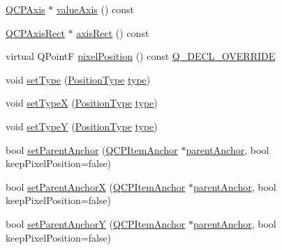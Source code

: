 \begin{DoxyCompactItemize}
\item 
\hyperlink{class_q_c_p_axis}{Q\+C\+P\+Axis} $\ast$ \hyperlink{class_q_c_p_item_position_a8d3a039fb2e69df86b4015daa30dfd2d}{value\+Axis} () const 
\item 
\hyperlink{class_q_c_p_axis_rect}{Q\+C\+P\+Axis\+Rect} $\ast$ \hyperlink{class_q_c_p_item_position_a7f10fa702a324880cc4de958f434cec7}{axis\+Rect} () const 
\item 
virtual Q\+PointF \hyperlink{class_q_c_p_item_position_a8be9a4787635433edecc75164beb748d}{pixel\+Position} () const \hyperlink{qcustomplot_8hh_a42cc5eaeb25b85f8b52d2a4b94c56f55}{Q\+\_\+\+D\+E\+C\+L\+\_\+\+O\+V\+E\+R\+R\+I\+DE}
\item 
void \hyperlink{class_q_c_p_item_position_aa476abf71ed8fa4c537457ebb1a754ad}{set\+Type} (\hyperlink{class_q_c_p_item_position_aad9936c22bf43e3d358552f6e86dbdc8}{Position\+Type} \hyperlink{class_q_c_p_item_position_aecb709d72c9aa334a7f62e2c9e0b5d60}{type})
\item 
void \hyperlink{class_q_c_p_item_position_a2113b2351d6d00457fb3559a4e20c3ea}{set\+TypeX} (\hyperlink{class_q_c_p_item_position_aad9936c22bf43e3d358552f6e86dbdc8}{Position\+Type} \hyperlink{class_q_c_p_item_position_aecb709d72c9aa334a7f62e2c9e0b5d60}{type})
\item 
void \hyperlink{class_q_c_p_item_position_ac2a454aa5a54c1615c50686601ec4510}{set\+TypeY} (\hyperlink{class_q_c_p_item_position_aad9936c22bf43e3d358552f6e86dbdc8}{Position\+Type} \hyperlink{class_q_c_p_item_position_aecb709d72c9aa334a7f62e2c9e0b5d60}{type})
\item 
bool \hyperlink{class_q_c_p_item_position_ac094d67a95d2dceafa0d50b9db3a7e51}{set\+Parent\+Anchor} (\hyperlink{class_q_c_p_item_anchor}{Q\+C\+P\+Item\+Anchor} $\ast$\hyperlink{class_q_c_p_item_position_a7b4ffab9946945c0e11cd2352dc2e042}{parent\+Anchor}, bool keep\+Pixel\+Position=false)
\item 
bool \hyperlink{class_q_c_p_item_position_add71461a973927c74e42179480916d9c}{set\+Parent\+AnchorX} (\hyperlink{class_q_c_p_item_anchor}{Q\+C\+P\+Item\+Anchor} $\ast$\hyperlink{class_q_c_p_item_position_a7b4ffab9946945c0e11cd2352dc2e042}{parent\+Anchor}, bool keep\+Pixel\+Position=false)
\item 
bool \hyperlink{class_q_c_p_item_position_add5ec1db9d19cec58a3b5c9e0a0c3f9d}{set\+Parent\+AnchorY} (\hyperlink{class_q_c_p_item_anchor}{Q\+C\+P\+Item\+Anchor} $\ast$\hyperlink{class_q_c_p_item_position_a7b4ffab9946945c0e11cd2352dc2e042}{parent\+Anchor}, bool keep\+Pixel\+Position=false)
\item 

\end{DoxyCompactItemize}
